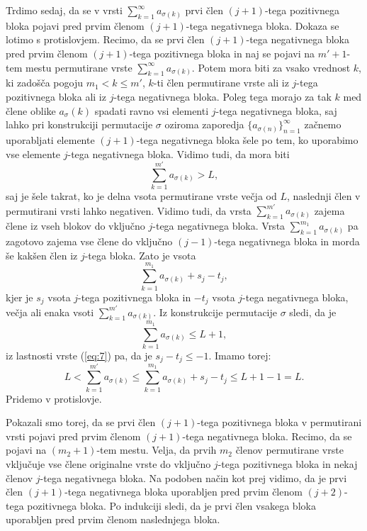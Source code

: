 \documentclass[12pt,a4paper,reqno]{amsart}
\theoremstyle{definition} %
\theoremstyle{plain} %
\begin{document}
Trdimo sedaj, da se v vrsti  $\sum_{k=1}^{\infty}a_{\sigma(k)}$ prvi člen $(j+1)$-tega pozitivnega bloka pojavi pred prvim členom $(j+1)$-tega negativnega bloka. %
Dokaza se lotimo s protislovjem. Recimo, da se prvi člen $(j+1)$-tega negativnega bloka pred prvim členom $(j+1)$-tega pozitivnega bloka in naj se pojavi na $m'+1$-tem mestu permutirane vrste $\sum_{k=1}^{\infty}a_{\sigma(k)}$. Potem mora biti za vsako vrednost $k$, ki zadošča pogoju $m_1<k\leq m'$, $k$-ti člen permutirane vrste ali iz $j$-tega pozitivnega bloka ali iz $j$-tega negativnega bloka. Poleg tega morajo za tak $k$ med člene oblike $a_\sigma(k)$ spadati ravno vsi elementi $j$-tega negativnega bloka, saj lahko pri konstrukciji permutacije $\sigma$ oziroma zaporedja $\{a_{\sigma(n)}\}_{n=1}^{\infty}$ začnemo uporabljati elemente $(j+1)$-tega negativnega bloka šele po tem, ko uporabimo vse elemente $j$-tega negativnega bloka. Vidimo tudi, da mora biti $$\sum_{k=1}^{m'}a_{\sigma(k)}>L,$$saj je šele takrat, ko je delna vsota permutirane vrste večja od $L$, naslednji člen v permutirani vrsti lahko negativen.
Vidimo tudi, da vrsta $\sum_{k=1}^{m'}a_{\sigma(k)}$ zajema člene iz vseh blokov do vključno $j$-tega negativnega bloka. %
Vrsta $\sum_{k=1}^{m_1}a_{\sigma(k)}$ pa zagotovo zajema vse člene do vključno $(j-1)$-tega negativnega bloka in morda še kakšen člen iz $j$-tega bloka. Zato je vsota $$\sum_{k=1}^{m_1}a_{\sigma(k)}+s_j-t_j,$$kjer je $s_j$ vsota $j$-tega pozitivnega bloka in $-t_j$ vsota $j$-tega negativnega bloka, večja ali enaka vsoti $\sum_{k=1}^{m'}a_{\sigma(k)}$. Iz konstrukcije permutacije $\sigma$ sledi, da je $$\sum_{k=1}^{m_1}a_{\sigma(k)}\leq L+1,$$ iz lastnosti vrste (\ref{eq:7}) pa, da je $s_j-t_j \leq -1$. Imamo torej: $$L< \sum_{k=1}^{m'}a_{\sigma(k)}\leq  \sum_{k=1}^{m_1}a_{\sigma(k)}+s_j-t_j \leq L+1-1=L.$$
Pridemo v protislovje.

Pokazali smo torej, da se prvi člen $(j+1)$-tega pozitivnega bloka v permutirani vrsti pojavi pred prvim členom $(j+1)$-tega negativnega bloka. Recimo, da se pojavi na $(m_2+1)$-tem mestu. Velja, da prvih $m_2$ členov permutirane vrste vključuje vse člene originalne vrste do vključno $j$-tega pozitivnega bloka in nekaj členov $j$-tega negativnega bloka. %
Na podoben način kot prej vidimo, da je prvi člen $(j+1)$-tega negativnega bloka uporabljen pred prvim členom $(j+2)$-tega pozitivnega bloka. %
Po indukciji sledi, da je prvi člen vsakega bloka uporabljen pred prvim členom naslednjega bloka.
\end{document}

